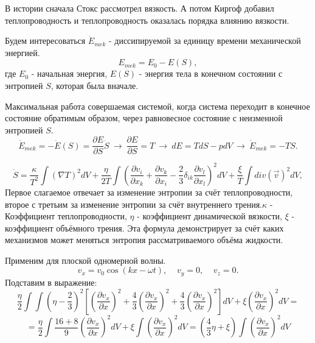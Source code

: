 \documentclass[14pt,a4paper,oneside]{extarticle}	%
\begin{document}
В истории сначала Стокс рассмотрел вязкость. А потом Киргоф добавил теплопроводность и теплопроводность оказалась порядка влиянию вязкости.

Будем интересоваться $ \dot{E}_{mek} $ - диссипируемой за единицу времени механической энергией.
\begin{equation*}
E_{mek} = E_{0} - E(S),
\end{equation*}
где $ E_{0} $ - начальная энергия, $ E(S) $ - энергия тела в конечном состоянии с энтропией $ S $, которая была вначале.

Максимальная работа совершаемая  системой, когда система переходит в конечное состояние обратимым образом, через равновесное состояние с неизменной энтропией $ S $.
\begin{equation*}
\dot{E}_{mek} = - \dot{E}(S) = \frac{\partial E}{\partial S}\dot{S}\:\longrightarrow\: \frac{\partial E}{\partial S} = T \:\longrightarrow\: dE = TdS - pdV  \:\longrightarrow\: \dot{E}_{mek} = - TS.
\end{equation*}

\begin{equation*}
\dot{S} = \frac{\kappa}{T^{2}}\int\left(\nabla T \right)^{2}dV + \frac{\eta}{2T}\int\left(\frac{\partial v_{i}}{\partial x_{k}} + \frac{\partial v_{k}}{\partial x_{i}} -\frac{2}{3}\delta_{ik}\frac{\partial v_{l}}{\partial x_{l}} \right)^{2}dV + \frac{\xi}{T} \int div(\vec{v})^{2}dV,
\end{equation*}
Первое слагаемое отвечает за изменение энтропии за счёт теплопроводности, второе с третьим за изменение энтропии за счёт внутреннего трения.$ \kappa $ - Коэффициент теплопроводности, $ \eta $ - коэффициент динамической вязкости, $ \xi  $ - коэффициент объёмного трения.
Эта формула демонстрирует за счёт каких механизмов может меняться энтропия рассматриваемого объёма жидкости.

Применим для плоской одномерной волны. 
\begin{equation*}
v_{x} = v_{0} \cos (kx - \omega t),\;\;\;\; v_{y} =0,\;\;\;\; v_{z} = 0.
\end{equation*}
Подставим в выражение:
\begin{equation*}
\frac{\eta}{2}\int\int \left(\eta - \frac{2}{3} \right)^{2}\left[\left(\frac{\partial v_{x}}{\partial x} \right)^{2} + \frac{4}{3}\left(\frac{\partial v_{x}}{\partial x} \right)^{2} + \frac{4}{3}\left(\frac{\partial v_{x}}{\partial x} \right)^{2}  \right]dV + \xi\left(\frac{\partial v_{x}}{\partial x} \right)^{2}dV =
\end{equation*}
\begin{equation*}
= \frac{\eta}{2}\int \frac{16+8}{9}\left(\frac{\partial v_{x}}{\partial x} \right)^{2}dV +\xi\int\left(\frac{\partial v_{x}}{\partial x} \right)^{2}dV = \left(\frac{4}{3}\eta + \xi \right) \int\left(\frac{\partial v_{x}}{\partial x} \right)^{2}dV
\end{equation*}
\end{document}
